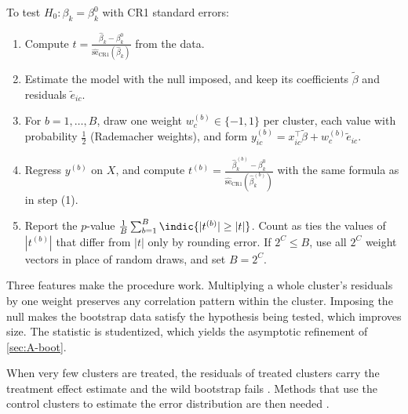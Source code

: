 \begin{remark}\label{rem:A-wild-cluster}
To test $H_0: \beta_k = \beta_k^0$ with CR1 standard errors:
\begin{enumerate}[label=(\arabic*)]
  \item Compute $t = \frac{\hat\beta_k - \beta_k^0}{\widehat{\mathrm{se}}_{\text{CR1}}(\hat\beta_k)}$ from the data.
  \item Estimate the model with the null imposed, and keep its coefficients $\tilde\beta$ and residuals $\tilde e_{ic}$.
  \item For $b = 1, \dots, B$, draw one weight $w_c^{(b)} \in \{-1, 1\}$ per cluster, each value with probability
  $\frac{1}{2}$ (Rademacher weights), and form $y^{(b)}_{ic} = x_{ic}^\top\tilde\beta + w_c^{(b)}\tilde e_{ic}$.
  \item Regress $y^{(b)}$ on $X$, and compute $t^{(b)} = \frac{\hat\beta^{(b)}_k -
  \beta_k^0}{\widehat{\mathrm{se}}_{\text{CR1}}(\hat\beta^{(b)}_k)}$ with the same formula as in step (1).
  \item Report the $p$-value $\frac{1}{B}\sum_{b=1}^{B}\indic\{|t^{(b)}| \ge |t|\}$. Count as ties the values of
  $|t^{(b)}|$ that differ from $|t|$ only by rounding error. If $2^C \le B$, use all $2^C$ weight vectors in place
  of random draws, and set $B = 2^C$.
\end{enumerate}
\end{remark}

Three features make the procedure work. Multiplying a whole cluster's residuals by one weight preserves any
correlation pattern within the cluster. Imposing the null makes the bootstrap data satisfy the hypothesis being
tested, which improves size. The statistic is studentized, which yields the asymptotic refinement of
\cref{sec:A-boot}.

When very few clusters are treated, the residuals of treated clusters carry the treatment effect estimate and the wild
bootstrap fails \citep{MacKinnonWebb2017}. Methods that use the control clusters to estimate the error
distribution are then needed \citep{ConleyTaber2011}.

